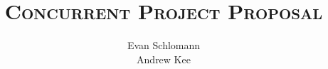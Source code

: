 \documentclass[12pt]{article}
\begin{document}
\doublespacing
\title{\Huge \textsc{Concurrent Project Proposal}}
\author{Evan Schlomann \\ Andrew Kee}

\maketitle
\vfill

\pagebreak



\vspace{.1in}



\vspace{.1in}



\vspace{.1in}



\vspace{.1in}
\end{document}
